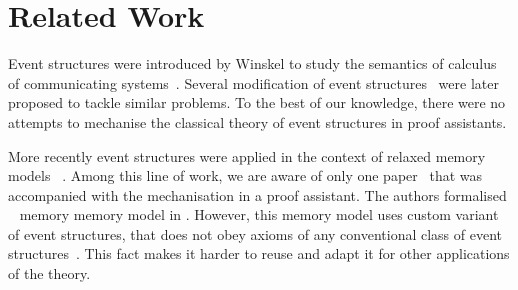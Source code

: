 \section{Related Work}


Event structures were introduced by Winskel to study the semantics of 
calculus of communicating systems~\cite{Winskel:82}. 
Several modification of event structures~\cite{Langerak:91, Boudol-Castellani:1991}
were later proposed to tackle similar problems.  
To the best of our knowledge, there were no attempts 
to mechanise the classical theory of event structures 
in proof assistants. 
 
More recently event structures were applied 
in the context of relaxed memory models~%
\cite{Jeffrey-Riely:LICS16, PichonPharabod-Sewell:POPL16, Chakraborty-Vafeiadis:POPL19, Moiseenko-al:ECOOP20}.
Among this line of work, we are aware of only one paper~\cite{Moiseenko-al:ECOOP20}
that was accompanied with the mechanisation in a proof assistant. 
The authors formalised \weakestmo~\cite{Chakraborty-Vafeiadis:POPL19} 
memory memory model in \coq. However, this memory model uses 
custom variant of event structures, that does not 
obey axioms of any conventional class of 
event structures~\cite{Winskel:82, Langerak:91, Boudol-Castellani:1991}. 
This fact makes it harder to reuse and adapt it 
for other applications of the theory. 

